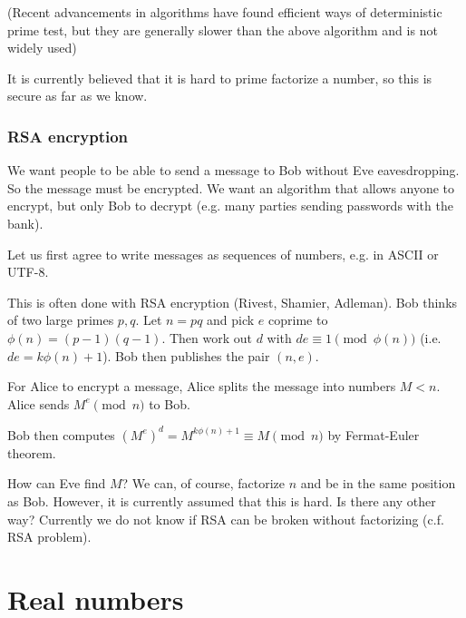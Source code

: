 \documentclass[a4paper]{article}
\begin{document}
  (Recent advancements in algorithms have found efficient ways of deterministic prime test, but they are generally slower than the above algorithm and is not widely used)

  It is currently believed that it is hard to prime factorize a number, so this is secure as far as we know.
  \subsubsection{RSA encryption}

  \begin{thm}
    We want people to be able to send a message to Bob without Eve eavesdropping. So the message must be encrypted. We want an algorithm that allows anyone to encrypt, but only Bob to decrypt (e.g. many parties sending passwords with the bank).

    Let us first agree to write messages as sequences of numbers, e.g. in ASCII or UTF-8.

    This is often done with RSA encryption (Rivest, Shamier, Adleman). Bob thinks of two large primes $p, q$. Let $n = pq$ and pick $e$ coprime to $\phi(n) = (p - 1)(q - 1)$. Then work out $d$ with $de \equiv 1\pmod {\phi(n)}$ (i.e. $de = k\phi(n) + 1$). Bob then publishes the pair $(n, e)$.

    For Alice to encrypt a message, Alice splits the message into numbers $M < n$. Alice sends $M^e \pmod n$ to Bob.

    Bob then computes $(M^e)^d = M^{k\phi(n) + 1} \equiv M\pmod n$ by Fermat-Euler theorem.

    How can Eve find $M$? We can, of course, factorize $n$ and be in the same position as Bob. However, it is currently assumed that this is hard. Is there any other way? Currently we do not know if RSA can be broken without factorizing (c.f. RSA problem).
  \end{thm}

  \section{Real numbers}
\end{document}
